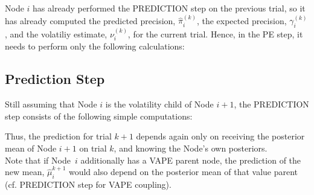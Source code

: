 Node $i$ has already performed the \textsf{PREDICTION step} on the previous trial, so it has already computed the predicted precision, $\hat{\pi}_{i}^{(k)}$, the expected precision, $\gamma_{i}^{(k)}$, and the volatiliy estimate, $\nu_i^{(k)}$, for the current trial. Hence, in the \textsf{PE step}, it needs to perform only the following calculations:
\vspace{0.5cm}

\noindent
{}%
\vspace{0.5cm}

\noindent

\subsection{Prediction Step}
Still assuming that Node $i$ is the volatility child of Node $i+1$, the \textsf{PREDICTION step} consists of the following simple computations:
\vspace{0.5cm}

\noindent
{}%
\vspace{0.5cm}

\noindent
Thus, the prediction for trial $k+1$ depends again only on receiving the posterior mean of Node $i+1$ on trial $k$, and knowing the Node's own posteriors.\\

Note that if Node~$i$ additionally has a \textsf{VAPE} parent node, the prediction of the new mean, $\hat{\mu}_i^{k+1}$ would also depend on the posterior mean of that value parent (cf. \textsf{PREDICTION step} for \textsf{VAPE} coupling).
